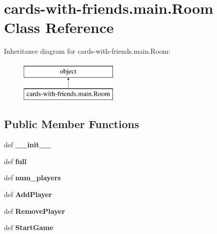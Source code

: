\hypertarget{classcards-with-friends_1_1main_1_1_room}{\section{cards-\/with-\/friends.main.\-Room Class Reference}
\label{classcards-with-friends_1_1main_1_1_room}
}
Inheritance diagram for cards-\/with-\/friends.main.\-Room\-:\begin{figure}[H]
\begin{center}
\leavevmode
\includegraphics[height=2.000000cm]{classcards-with-friends_1_1main_1_1_room}
\end{center}
\end{figure}
\subsection*{Public Member Functions}
\begin{DoxyCompactItemize}
\item 
\hypertarget{classcards-with-friends_1_1main_1_1_room_ac299bcc847fb04e88cc2d617040d713d}{def {\bfseries \-\_\-\-\_\-init\-\_\-\-\_\-}}\label{classcards-with-friends_1_1main_1_1_room_ac299bcc847fb04e88cc2d617040d713d}

\item 
\hypertarget{classcards-with-friends_1_1main_1_1_room_a84ce168193a77212ae2bd63089d43867}{def {\bfseries full}}\label{classcards-with-friends_1_1main_1_1_room_a84ce168193a77212ae2bd63089d43867}

\item 
\hypertarget{classcards-with-friends_1_1main_1_1_room_a10f45f9f510a1903394259a659e0b374}{def {\bfseries num\-\_\-players}}\label{classcards-with-friends_1_1main_1_1_room_a10f45f9f510a1903394259a659e0b374}

\item 
\hypertarget{classcards-with-friends_1_1main_1_1_room_a03e7fd00e4ffe93adbbcb48fb35bd133}{def {\bfseries Add\-Player}}\label{classcards-with-friends_1_1main_1_1_room_a03e7fd00e4ffe93adbbcb48fb35bd133}

\item 
\hypertarget{classcards-with-friends_1_1main_1_1_room_ab325f2b38b1315a1e6ce367b55c1f77b}{def {\bfseries Remove\-Player}}\label{classcards-with-friends_1_1main_1_1_room_ab325f2b38b1315a1e6ce367b55c1f77b}

\item 
\hypertarget{classcards-with-friends_1_1main_1_1_room_a6df7c631f0179fe2c8202cebca309c74}{def {\bfseries Start\-Game}}\label{classcards-with-friends_1_1main_1_1_room_a6df7c631f0179fe2c8202cebca309c74}

\end{DoxyCompactItemize}
